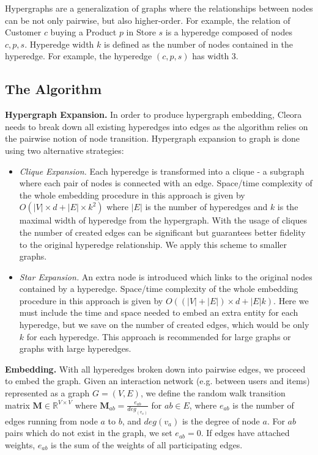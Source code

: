 \documentclass{IEEEtran}
\begin{document}
Hypergraphs are a generalization of graphs where the relationships between nodes can be not only pairwise, but also higher-order. For example, the relation of Customer $c$ buying a Product $p$ in Store $s$ is a hyperedge composed of nodes ${c, p, s}$. Hyperedge width $k$ is defined as the number of nodes contained in the hyperedge. For example, the hyperedge $(c, p, s)$ has width 3.

\subsection{The Algorithm}

\textbf{Hypergraph Expansion.} 
  In order to produce hypergraph embedding, Cleora needs to break down all existing hyperedges into edges as the algorithm relies on the pairwise notion of node transition. Hypergraph expansion to graph is done using two alternative strategies:
\begin{itemize}
    \item \textit{Clique Expansion.} Each hyperedge is transformed into a clique - a subgraph where each pair of nodes is connected with an edge. Space/time complexity of the whole embedding procedure in this approach is given by $O(|V| \times d + |E| \times k^2)$ where $|E|$ is the number of hyperedges and $k$ is the maximal width of hyperedge from the hypergraph. With the usage of cliques the number of created edges can be significant but guarantees better fidelity to the original hyperedge relationship. We apply this scheme to smaller graphs.
    \item \textit{Star Expansion.} An extra node is introduced which links to the original nodes contained by a hyperedge. Space/time complexity of the whole embedding procedure in this approach is given by $O((|V|+|E|) \times d + |E|k)$. Here we must include the time and space needed to embed an extra entity for each hyperedge, but we save on the number of created edges, which would be only $k$ for each hyperedge. This approach is recommended for large graphs or graphs with large hyperedges.
\end{itemize}


\textbf{Embedding.} With all hyperedges broken down into pairwise edges, we proceed to embed the graph. Given an interaction network (e.g. between users and items) represented as a graph
$G=(V,E)$, we define the random walk transition matrix $\mathbf{M}\in \mathbb{R}^{V \times V} $ where $\mathbf{M}_{a b}=\frac{e_{a b}}{deg_(v_{a})}$ for $a b \in E$, where $e_{ab}$ is the
number of edges running from node $a$ to $b$, and $deg(v_{a})$ is the degree of node $a$. For $a b$ pairs which do not exist in the graph, we set $e_{a b} = 0$.
If edges have attached weights, $e_{ab}$ is the sum of the weights of all participating edges. 
\end{document}
